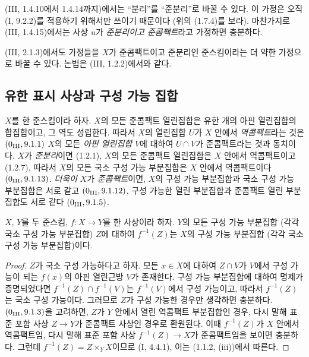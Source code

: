 \begin{env}[1.7.21]
\label{IV.1.7.21-fr}
(III, 1.4.10에서 1.4.14까지)에서는 ``분리''를 ``준분리''로 바꿀
수 있다. 이 가정은 오직 (I, 9.2.2)를 적용하기 위해서만 쓰이기
때문이다 (위의 (1.7.4)를 보라). 마찬가지로 (III, 1.4.15)에서는
사상 $u$가 \emph{준분리이고 준콤팩트}라고 가정하면 충분하다.
\end{env}

\begin{env}[1.7.22]
\label{IV.1.7.22-fr}
(III, 2.1.3)에서도 가정들을 $X$가 준콤팩트이고 준분리인 준스킴이라는
더 약한 가정으로 바꿀 수 있다. 논법은 (III, 1.2.2)에서와 같다.
\end{env}

\subsection{유한 표시 사상과 구성 가능 집합}
\label{subsection:IV.1.8-fr}


\begin{env}[1.8.1]
\label{IV.1.8.1-fr}
$X$를 한 준스킴이라 하자. $X$의 모든 준콤팩트 열린집합은 유한 개의
아핀 열린집합의 합집합이고, 그 역도 성립한다. 따라서 $X$의 열린집합
$U$가 $X$ 안에서 \emph{역콤팩트}라는 것은
$(0\textsubscript{III}, 9.1.1)$ $X$의 모든 \emph{아핀 열린집합}
$V$에 대하여 $U\cap V$가 준콤팩트라는 것과 동치이다. $X$가
\emph{준분리}이면
(1.2.1), $X$의 모든 준콤팩트 열린집합은 $X$ 안에서 역콤팩트이고
(1.2.7), 따라서 $X$의 모든 국소 구성 가능 부분집합은 $X$ 안에서
역콤팩트이다 $(0\textsubscript{III}, 9.1.13)$. \emph{더욱이} $X$가
\emph{준콤팩트}이면, $X$의 구성 가능 부분집합과 국소 구성 가능
부분집합은 서로 같고 $(0\textsubscript{III}, 9.1.12)$, 구성 가능한
열린 부분집합과 준콤팩트 열린 부분집합도 서로 같다
$(0\textsubscript{III}, 9.1.5)$.
\end{env}

\begin{proposition}[1.8.2]
\label{IV.1.8.2-fr}
$X$, $Y$를 두 준스킴, $f:X\to Y$를 한 사상이라 하자. $Y$의 모든
구성 가능 부분집합 (각각 국소 구성 가능 부분집합) $Z$에 대하여
$f^{-1}(Z)$는 $X$의 구성 가능 부분집합 (각각 국소 구성 가능
부분집합)이다.
\end{proposition}

\begin{proof}
$Z$가 국소 구성 가능하다고 하자. 모든 $x\in X$에 대하여 $Z\cap V$가
$V$에서 구성 가능이 되는 $f(x)$의 아핀 열린근방 $V$가 존재한다.
구성 가능 부분집합에 대하여 명제가 증명되었다면
$f^{-1}(Z)\cap f^{-1}(V)$는 $f^{-1}(V)$에서 구성 가능이고, 따라서
$f^{-1}(Z)$는 국소 구성 가능이다. 그러므로 $Z$가 구성 가능한 경우만
생각하면 충분하다. $(0\textsubscript{III}, 9.1.3)$을 고려하면, $Z$가
$Y$ 안에서 열린 역콤팩트 부분집합인 경우, 다시 말해 표준 포함 사상
$Z\to Y$가 준콤팩트 사상인 경우로 환원된다. 이때 $f^{-1}(Z)$가
$X$ 안에서 역콤팩트임, 다시 말해 표준 포함 사상
$f^{-1}(Z)\to X$가 준콤팩트임을 보이면 충분하다. 그런데
$f^{-1}(Z)=Z\times_YX$이므로 (I, 4.4.1), 이는 (1.1.2, (iii))에서
따른다.
\end{proof}

